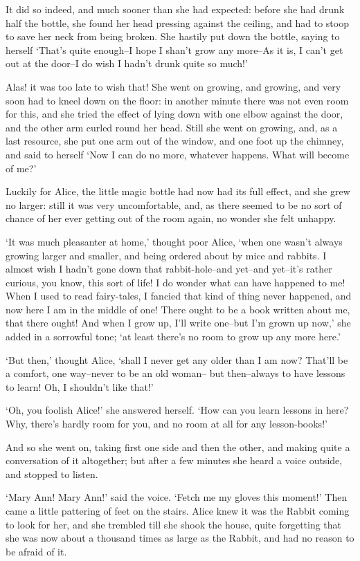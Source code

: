 \documentclass[statementpaper,twoside,openany]{memoir}
\begin{document}
It did so indeed, and much sooner than she had expected: before she had drunk half the bottle, she found her head pressing against the ceiling, and had to stoop to save her neck from being broken. She hastily put down the bottle, saying to herself `That's quite enough--I hope I shan't grow any more--As it is, I can't get out at the door--I do wish I hadn't drunk quite so much!'

Alas! it was too late to wish that! She went on growing, and growing, and very soon had to kneel down on the floor: in another minute there was not even room for this, and she tried the effect of lying down with one elbow against the door, and the other arm curled round her head. Still she went on growing, and, as a last resource, she put one arm out of the window, and one foot up the chimney, and said to herself `Now I can do no more, whatever happens. What will become of me?'

Luckily for Alice, the little magic bottle had now had its full effect, and she grew no larger: still it was very uncomfortable, and, as there seemed to be no sort of chance of her ever getting out of the room again, no wonder she felt unhappy.

`It was much pleasanter at home,' thought poor Alice, `when one wasn't always growing larger and smaller, and being ordered about by mice and rabbits. I almost wish I hadn't gone down that rabbit-hole--and yet--and yet--it's rather curious, you know, this sort of life! I do wonder what can have happened to me! When I used to read fairy-tales, I fancied that kind of thing never happened, and now here I am in the middle of one! There ought to be a book written about me, that there ought! And when I grow up, I'll write one--but I'm grown up now,' she added in a sorrowful tone; `at least there's no room to grow up any more here.'

`But then,' thought Alice, `shall I never get any older than I am now? That'll be a comfort, one way--never to be an old woman-- but then--always to have lessons to learn! Oh, I shouldn't like that!'

`Oh, you foolish Alice!' she answered herself. `How can you learn lessons in here? Why, there's hardly room for you, and no room at all for any lesson-books!'

And so she went on, taking first one side and then the other, and making quite a conversation of it altogether; but after a few minutes she heard a voice outside, and stopped to listen.

`Mary Ann! Mary Ann!' said the voice. `Fetch me my gloves this moment!' Then came a little pattering of feet on the stairs. Alice knew it was the Rabbit coming to look for her, and she trembled till she shook the house, quite forgetting that she was now about a thousand times as large as the Rabbit, and had no reason to be afraid of it.
\end{document}
